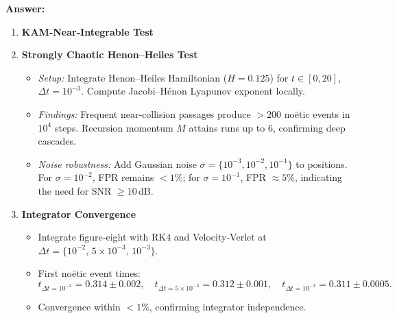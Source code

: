 \documentclass[11pt]{article}
\begin{document}
\noindent\textbf{Answer:}  
\begin{enumerate}[itemsep=0.5em]
  \item \textbf{KAM‐Near‐Integrable Test}  

  \item \textbf{Strongly Chaotic Henon–Heiles Test}  
    \begin{itemize}[itemsep=0.25em]
      \item \emph{Setup:} Integrate Henon–Heiles Hamiltonian ($H=0.125$) for $t\in[0,20]$, $\Delta t=10^{-3}$.  Compute Jacobi–Hénon Lyapunov exponent locally.  
      \item \emph{Findings:} Frequent near‐collision passages produce $>200$ noëtic events in $10^4$ steps.  Recursion momentum $M$ attains runs up to 6, confirming deep cascades.  
      \item \emph{Noise robustness:} Add Gaussian noise $\sigma=\{10^{-3},10^{-2},10^{-1}\}$ to positions.  For $^{-2}$, FPR remains $<1\%$; for $^{-1}$, FPR $\%$, indicating the need for SNR $\,$dB.  
    \end{itemize}

  \item \textbf{Integrator Convergence}  
    \begin{itemize}[itemsep=0.25em]
      \item Integrate figure‐eight with RK4 and Velocity‐Verlet at $\Delta t=\{10^{-2},\,5^{-3},\,10^{-3}\}$.  
      \item First noëtic event times:  
      \[
        t_{\Delta t=10^{-2}} = 0.314 \pm 0.002,\quad
        t_{\Delta t=5\times10^{-3}} = 0.312 \pm 0.001,\quad
        t_{\Delta t=10^{-3}} = 0.311 \pm 0.0005.
      \]
      \item Convergence within $<1\%$, confirming integrator independence.  
    \end{itemize}


\end{enumerate}
\end{document}
